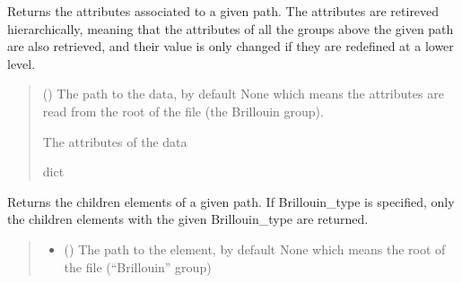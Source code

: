 \documentclass[letterpaper,10pt,english]{sphinxmanual}
\begin{document}
\begin{fulllineitems}
\begin{fulllineitems}
\label{\detokenize{source/_autosummary/HDF5_BLS.Wrapper:HDF5_BLS.Wrapper.get_attributes}}
\pysigstartsignatures
\pysiglinewithargsret
{}
{}
{}
\pysigstopsignatures
\sphinxAtStartPar
Returns the attributes associated to a given path. The attributes are retireved hierarchically, meaning that the attributes of all the groups above the given path are also retrieved, and their value is only changed if they are redefined at a lower level.
\begin{quote}\begin{description}
\sphinxAtStartPar
{} (\sphinxstyleliteralemphasis{\sphinxupquote{, }}) \textendash{} The path to the data, by default None which means the attributes are read from the root of the file (the Brillouin group).

\sphinxAtStartPar
{} \textendash{} The attributes of the data

\sphinxAtStartPar
dict

\end{description}\end{quote}

\end{fulllineitems}


\begin{fulllineitems}
\label{\detokenize{source/_autosummary/HDF5_BLS.Wrapper:HDF5_BLS.Wrapper.get_children_elements}}
\pysigstartsignatures
\pysiglinewithargsret
{}
{\sphinxparamcomma {}}
{}
\pysigstopsignatures
\sphinxAtStartPar
Returns the children elements of a given path. If Brillouin\_type is specified, only the children elements with the given Brillouin\_type are returned.
\begin{quote}\begin{description}
\begin{itemize}
\item {} 
\sphinxAtStartPar
{} (\sphinxstyleliteralemphasis{\sphinxupquote{, }}) \textendash{} The path to the element, by default None which means the root of the file (“Brillouin” group)


\end{itemize}
\end{description}
\end{quote}
\end{fulllineitems}
\end{fulllineitems}
\end{document}
